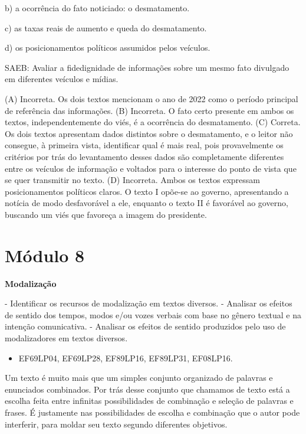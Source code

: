 b) a ocorrência do fato noticiado: o desmatamento.

c) as taxas reais de aumento e queda do desmatamento.

d) os posicionamentos políticos assumidos pelos veículos.

SAEB: Avaliar a fidedignidade de informações sobre um mesmo fato
divulgado em diferentes veículos e mídias.

(A) Incorreta. Os dois textos mencionam o ano de 2022 como o período
principal de referência das informações. (B) Incorreta. O fato certo
presente em ambos os textos, independentemente do viés, é a ocorrência
do desmatamento. (C) Correta. Os dois textos apresentam dados distintos
sobre o desmatamento, e o leitor não consegue, à primeira vista,
identificar qual é mais real, pois provavelmente os critérios por trás
do levantamento desses dados são completamente diferentes entre os
veículos de informação e voltados para o interesse do ponto de vista que
se quer transmitir no texto. (D) Incorreta. Ambos os textos expressam
posicionamentos políticos claros. O texto I opõe-se ao governo,
apresentando a notícia de modo desfavorável a ele, enquanto o texto II é
favorável ao governo, buscando um viés que favoreça a imagem do
presidente.


\section{Módulo 8}

\textbf{Modalização}


- Identificar os recursos de modalização
em textos diversos. - Analisar os efeitos de sentido dos tempos, modos
e/ou vozes verbais com base no gênero textual e na intenção
comunicativa. - Analisar os efeitos de sentido produzidos pelo uso de
modalizadores em textos diversos.


\begin{itemize}
\tightlist
\item
  EF69LP04, EF69LP28, EF89LP16, EF89LP31, EF08LP16.
\end{itemize}

Um texto é muito mais que um simples conjunto organizado de palavras e
enunciados combinados. Por trás desse conjunto que chamamos de texto
está a escolha feita entre infinitas possibilidades de combinação e
seleção de palavras e frases. É justamente nas possibilidades de escolha
e combinação que o autor pode interferir, para moldar seu texto segundo
diferentes objetivos.

